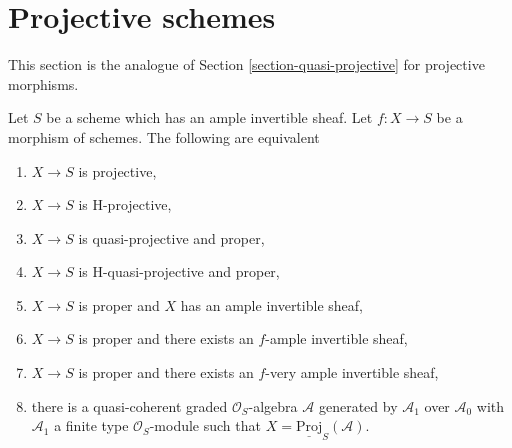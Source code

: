 \section{Projective schemes}
\label{section-projective}

\noindent
This section is the analogue of Section \ref{section-quasi-projective}
for projective morphisms.

\begin{lemma}
\label{lemma-projective}
Let $S$ be a scheme which has an ample invertible sheaf.
Let $f : X \to S$ be a morphism of schemes. The following are
equivalent
\begin{enumerate}
\item $X \to S$ is projective,
\item $X \to S$ is H-projective,
\item $X \to S$ is quasi-projective and proper,
\item $X \to S$ is H-quasi-projective and proper,
\item $X \to S$ is proper and $X$ has an ample invertible sheaf,
\item $X \to S$ is proper and there exists an $f$-ample invertible sheaf,
\item $X \to S$ is proper and there exists an $f$-very ample invertible sheaf,
\item there is a quasi-coherent graded $\mathcal{O}_S$-algebra $\mathcal{A}$
generated by $\mathcal{A}_1$ over $\mathcal{A}_0$ with $\mathcal{A}_1$ a
finite type $\mathcal{O}_S$-module such that
$X = \underline{\text{Proj}}_S(\mathcal{A})$. 
\end{enumerate}
\end{lemma}

